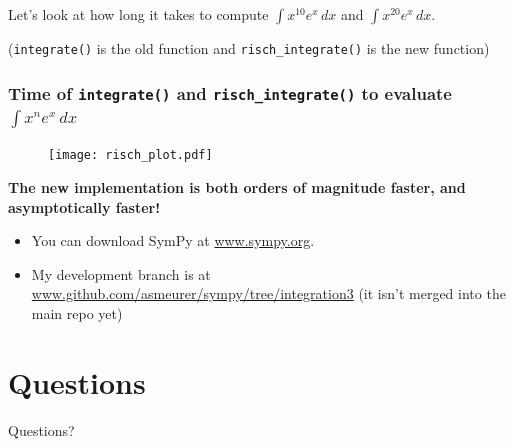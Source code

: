 \documentclass{beamer}
\numberwithin{equation}{section} %
\newcommand{\rischintegrate}{\texttt{risch\_integrate()}}
\begin{document}
\begin{frame}
    Let's look at how long it takes to compute $\int{x^{10}e^x\,dx}$ and $\int{x^{20}e^x\,dx}$.
    \begin{figure}
    \begin{flushleft}
    \end{flushleft}
    \end{figure}
    (\texttt{integrate()} is the old function and \rischintegrate{} is
    the new function)
\end{frame}

\begin{frame}
    \frametitle{Time of \texttt{integrate()} and \rischintegrate{} to evaluate $\int x^ne^x\,dx$}
    \begin{figure}
    \texttt{[image: risch\_plot.pdf]}
    \end{figure}
    {\bf The new implementation is both orders of magnitude faster, and
    asymptotically faster!}
\end{frame}

\begin{frame}
    \begin{itemize}
        \item You can download SymPy at \url{www.sympy.org}.    
        \item My development branch is at
        \url{www.github.com/asmeurer/sympy/tree/integration3} (it
        isn't merged into the main repo yet)
    \end{itemize}
\end{frame}

\section{Questions}

\begin{frame}
    \huge{Questions?}
\end{frame}
\end{document}
